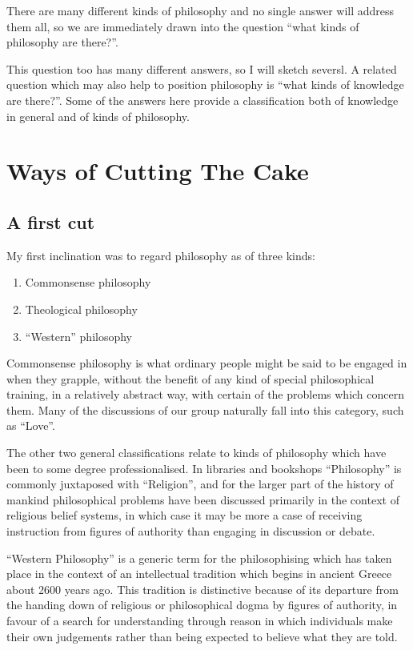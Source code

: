 \documentclass[10pt,titlepage]{article}
\begin{document}
There are many different kinds of philosophy and no single answer will address them all, so we are immediately drawn into the question ``what kinds of philosophy are there?''.

This question too has many different answers, so I will sketch seversl.
A related question which may also help to position philosophy is ``what kinds of knowledge are there?''.
Some of the answers here provide a classification both of knowledge in general and of kinds of philosophy.

\section{Ways of Cutting The Cake}

\subsection{A first cut}

My first inclination was to regard philosophy as of three kinds:

\begin{enumerate}
\item Commonsense philosophy
\item Theological philosophy
\item ``Western'' philosophy
\end{enumerate}

Commonsense philosophy is what ordinary people might be said to be engaged in when they grapple, without the benefit of any kind of special philosophical training, in a relatively abstract way, with certain of the problems which concern them.
Many of the discussions of our group naturally fall into this category, such as ``Love''.

The other two general classifications relate to kinds of philosophy which have been to some degree professionalised.
In libraries and bookshops ``Philosophy'' is commonly juxtaposed with ``Religion'', and for the larger part of the history of mankind philosophical problems have been discussed primarily in the context of religious belief systems, in which case it may be more a case of receiving instruction from figures of authority than engaging in discussion or debate.

``Western Philosophy'' is a generic term for the philosophising which has taken place in the context of an intellectual tradition which begins in ancient Greece about 2600 years ago.
This tradition is distinctive because of its departure from the handing down of religious or philosophical dogma by figures of authority, in favour of a search for understanding through reason in which individuals make their own judgements rather than being expected to believe what they are told. 
\end{document}
